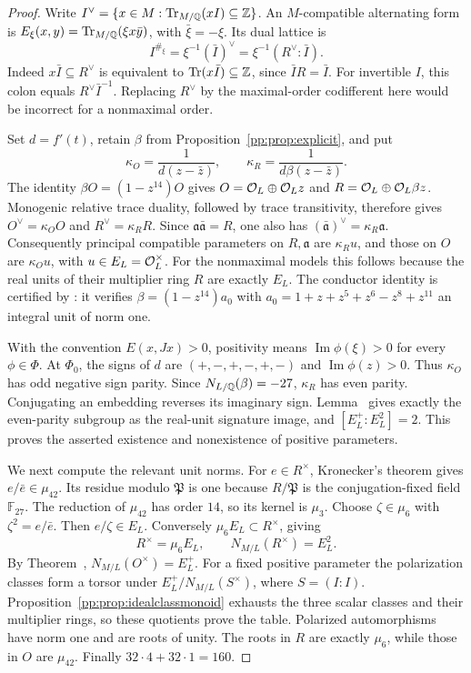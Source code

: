 \begin{proof}
Write $I^\vee=\{x\in M:\operatorname{Tr}_{M/\mathbb Q}(xI)\subseteq\mathbb Z\}$.
An $M$-compatible alternating form is
$E_\xi(x,y)=\operatorname{Tr}_{M/\mathbb Q}(\xi x\bar y)$, with $\bar\xi=-\xi$.
Its dual lattice is
\[
 I^{\#_\xi}=\xi^{-1}(\bar I)^\vee
             =\xi^{-1}(R^\vee:\bar I).
\]
Indeed $x\bar I\subseteq R^\vee$ is equivalent to
$\operatorname{Tr}(x\bar I)\subseteq\mathbb Z$, since $\bar I R=\bar I$.
For invertible $I$, this colon equals $R^\vee\bar I^{-1}$.
Replacing $R^\vee$ by the maximal-order codifferent here would be
incorrect for a nonmaximal order.

Set $d=f'(t)$, retain $\beta$ from Proposition~\ref{pp:prop:explicit},
and put
\[
 \kappa_O=\frac1{d(z-\bar z)},\qquad
 \kappa_R=\frac1{d\beta(z-\bar z)}.
\]
The identity $\beta O=(1-z^{14})O$ gives
$O=\mathcal O_L\oplus\mathcal O_L z$ and $R=\mathcal O_L\oplus\mathcal O_L\beta z$.
Monogenic relative trace duality, followed by trace transitivity,
therefore gives $O^\vee=\kappa_O O$ and $R^\vee=\kappa_R R$.
Since $\mathfrak a\bar{\mathfrak a}=R$, one also has
$(\bar{\mathfrak a})^\vee=\kappa_R\mathfrak a$.
Consequently principal compatible parameters on $R,\mathfrak a$
are $\kappa_R u$, and those on $O$ are $\kappa_O u$, with
$u\in E_L=\mathcal O_L^\times$. For the nonmaximal models this follows
because the real units of their multiplier ring $R$ are exactly $E_L$.
The conductor identity is certified by
: it verifies
$\beta=(1-z^{14})a_0$ with
$a_0=1+z+z^5+z^6-z^8+z^{11}$ an integral unit of norm one.

With the convention $E(x,Jx)>0$, positivity means
$\operatorname{Im}\phi(\xi)>0$ for every $\phi\in\Phi$.
At $\Phi_0$, the signs of $d$ are $(+,-,+,-,+,-)$ and
$\operatorname{Im}\phi(z)>0$. Thus $\kappa_O$ has odd negative
sign parity. Since $N_{L/\mathbb Q}(\beta)=-27$, $\kappa_R$ has even
parity. Conjugating an embedding reverses its imaginary sign.
Lemma~ gives exactly the even-parity subgroup
as the real-unit signature image, and
$[E_L^+:E_L^2]=2$. This proves the asserted existence and
nonexistence of positive parameters.

We next compute the relevant unit norms. For $e\in R^\times$,
Kronecker's theorem gives $e/\bar e\in\mu_{42}$.
Its residue modulo $\mathfrak P$ is one because $R/\mathfrak P$
is the conjugation-fixed field $\mathbb F_{27}$.
The reduction of $\mu_{42}$ has order $14$, so its kernel is
$\mu_3$. Choose $\zeta\in\mu_6$ with $\zeta^2=e/\bar e$.
Then $e/\zeta\in E_L$. Conversely $\mu_6E_L\subset R^\times$,
giving
\[
 R^\times=\mu_6E_L,\qquad N_{M/L}(R^\times)=E_L^2.
\]
By Theorem~, $N_{M/L}(O^\times)=E_L^+$.
For a fixed positive parameter the polarization classes form a torsor
under $E_L^+/N_{M/L}(S^\times)$, where $S=(I:I)$.
Proposition~\ref{pp:prop:idealclassmonoid} exhausts the three scalar
classes and their multiplier rings, so these quotients prove the table.
Polarized automorphisms have norm one and are roots of unity.
The roots in $R$ are exactly $\mu_6$, while those in $O$ are
$\mu_{42}$. Finally $32\cdot4+32\cdot1=160$.
\end{proof}


